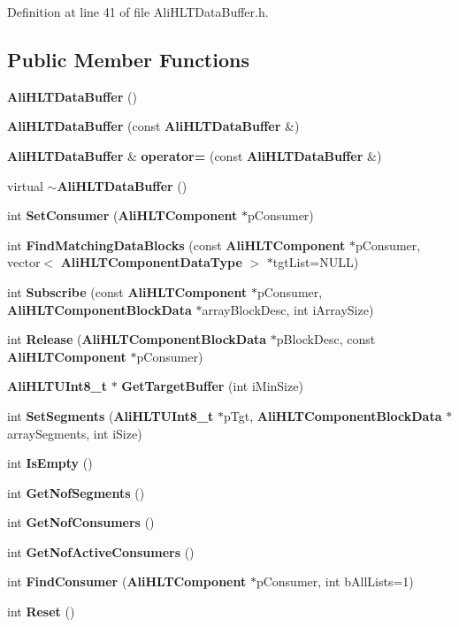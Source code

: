 Definition at line 41 of file Ali\-HLTData\-Buffer.h.\subsection*{Public Member Functions}
\begin{CompactItemize}
\item 
{\bf Ali\-HLTData\-Buffer} ()
\item 
{\bf Ali\-HLTData\-Buffer} (const {\bf Ali\-HLTData\-Buffer} \&)
\item 
{\bf Ali\-HLTData\-Buffer} \& {\bf operator=} (const {\bf Ali\-HLTData\-Buffer} \&)
\item 
virtual {\bf $\sim$Ali\-HLTData\-Buffer} ()
\item 
int {\bf Set\-Consumer} ({\bf Ali\-HLTComponent} $\ast$p\-Consumer)
\item 
int {\bf Find\-Matching\-Data\-Blocks} (const {\bf Ali\-HLTComponent} $\ast$p\-Consumer, vector$<$ {\bf Ali\-HLTComponent\-Data\-Type} $>$ $\ast$tgt\-List=NULL)
\item 
int {\bf Subscribe} (const {\bf Ali\-HLTComponent} $\ast$p\-Consumer, {\bf Ali\-HLTComponent\-Block\-Data} $\ast$array\-Block\-Desc, int i\-Array\-Size)
\item 
int {\bf Release} ({\bf Ali\-HLTComponent\-Block\-Data} $\ast$p\-Block\-Desc, const {\bf Ali\-HLTComponent} $\ast$p\-Consumer)
\item 
{\bf Ali\-HLTUInt8\_\-t} $\ast$ {\bf Get\-Target\-Buffer} (int i\-Min\-Size)
\item 
int {\bf Set\-Segments} ({\bf Ali\-HLTUInt8\_\-t} $\ast$p\-Tgt, {\bf Ali\-HLTComponent\-Block\-Data} $\ast$array\-Segments, int i\-Size)
\item 
int {\bf Is\-Empty} ()
\item 
int {\bf Get\-Nof\-Segments} ()
\item 
int {\bf Get\-Nof\-Consumers} ()
\item 
int {\bf Get\-Nof\-Active\-Consumers} ()
\item 
int {\bf Find\-Consumer} ({\bf Ali\-HLTComponent} $\ast$p\-Consumer, int b\-All\-Lists=1)
\item 
int {\bf Reset} ()
\end{CompactItemize}
